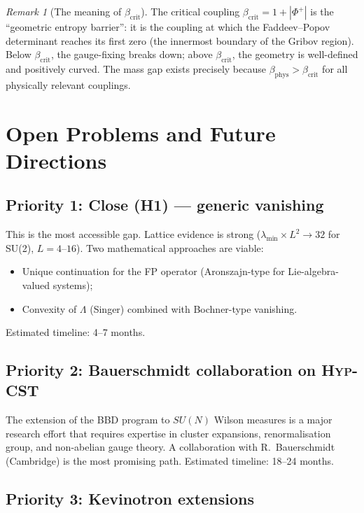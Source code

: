 \documentclass[11pt,a4paper]{amsart}
\theoremstyle{definition}
\theoremstyle{remark}
\newtheorem{remark}[theorem]{Remark}
\newcommand{\PhiPlus}{\Phi^+}
\newcommand{\betacrit}{\beta_{\mathrm{crit}}}
\begin{document}
\begin{remark}[The meaning of $\betacrit$]
The critical coupling $\betacrit = 1 + |\PhiPlus|$ is the ``geometric
entropy barrier'': it is the coupling at which the Faddeev--Popov
determinant reaches its first zero (the innermost boundary of the Gribov
region). Below $\betacrit$, the gauge-fixing breaks down; above
$\betacrit$, the geometry is well-defined and positively curved. The
mass gap exists precisely because $\beta_{\mathrm{phys}} > \betacrit$
for all physically relevant couplings.
\end{remark}

\section{Open Problems and Future Directions}\label{sec:future}

\subsection{Priority 1: Close (H1) --- generic vanishing}

This is the most accessible gap. Lattice evidence is strong
($\lambda_{\min} \times L^2 \to 32$ for SU(2), $L = 4$--$16$). Two
mathematical approaches are viable:
\begin{itemize}[leftmargin=1.5em]
\item Unique continuation for the FP operator (Aronszajn-type for
      Lie-algebra-valued systems);
\item Convexity of $\Lambda$ (Singer) combined with Bochner-type
      vanishing.
\end{itemize}
Estimated timeline: 4--7 months.

\subsection{Priority 2: Bauerschmidt collaboration on \textsc{Hyp-CST}}

The extension of the BBD program to $SU(N)$ Wilson measures is a
major research effort that requires expertise in cluster expansions,
renormalisation group, and non-abelian gauge theory. A collaboration
with R.\ Bauerschmidt (Cambridge) is the most promising path.
Estimated timeline: 18--24 months.

\subsection{Priority 3: Kevinotron extensions}
\end{document}
